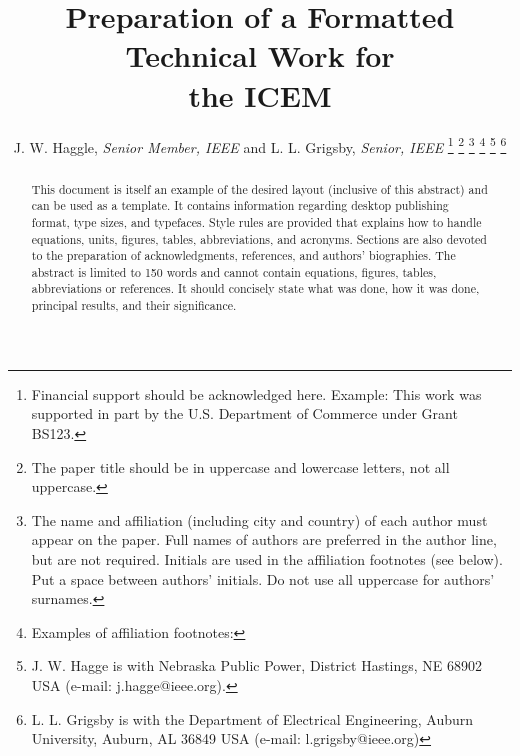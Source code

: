 \documentclass[a4paper]{IEEEtran}
\begin{document}
%
\title{Preparation of a Formatted Technical Work for \\ the ICEM\vspace{-.1em}}

\author{J. W. Haggle, \textit{Senior Member, IEEE}
	and L. L. Grigsby, \textit{Senior, IEEE}
\thanks{Financial support should be acknowledged here. Example: This work was supported in part by the U.S. Depart­ment of Com­merce under Grant BS123.}
\thanks{The paper title should be in uppercase and lowercase letters, not all uppercase.}
\thanks{The name and affiliation (including city and country) of each author must appear on the paper. Full names of authors are preferred in the author line, but are not required. Initials are used in the affiliation footnotes (see below). Put a space between authors' initials. Do not use all uppercase for authors' surnames.}
\thanks{Examples of affiliation footnotes:}%
\thanks{J. W. Hagge is with Nebraska Public Power, District Hastings, NE 68902 USA (e-mail: j.hagge@ieee.org).}%
\thanks{L. L. Grigsby is with the Department of Electrical Engineering, Auburn University, Auburn, AL 36849 USA (e-mail: l.grigsby@ieee.org)}%
\vspace{-.45em}
}

\maketitle

\thispagestyle{empty}
\begin{abstract}
This document is itself an example of the desired layout (inclusive of this abstract) and can be used as a template. 
 It contains information regarding desktop publishing format, type sizes, and typefaces. Style rules are provided that 
 explains how to handle equations, units, figures, tables, abbreviations, and acronyms. Sections are also devoted to the 
 preparation of acknowledgments, references, and authors' biographies. The abstract is limited to 150 words and cannot 
 contain equations, figures, tables, abbreviations or references. It should concisely state what was done, how it was done,
 principal results, and their significance.
\end{abstract}

\vspace{1em}
\end{document}
